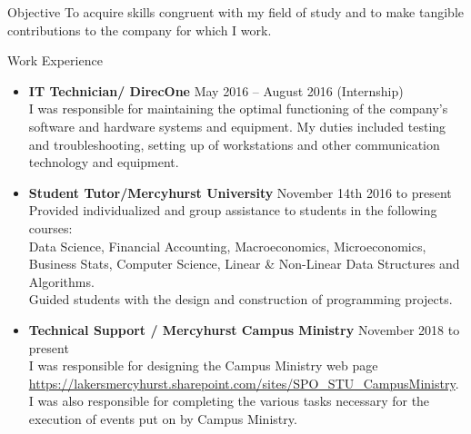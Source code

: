 \documentclass[11pt]{resume} %
\newcommand{\bold}[1]{\textbf{#1}}
\begin{document}
	
\begin{rSection}{Objective}
	To acquire skills congruent with my field of study and to make tangible contributions to the company for which I work.
\end{rSection}
\begin{rSection}{Work Experience}
\begin{itemize}
	\item\bold{IT Technician/ DirecOne} \quad May 2016 – August 2016 (Internship)\\
	I was responsible for maintaining the optimal functioning of the company’s software and hardware systems and equipment. My duties included testing and troubleshooting, setting up of workstations and other communication technology and equipment.\\
	
	\item\bold{Student Tutor/Mercyhurst University} \quad November 14th 2016 to present\\
	Provided individualized and group assistance to students in the following courses:\\ Data Science, Financial Accounting, Macroeconomics, Microeconomics, Business Stats, Computer Science, Linear \& Non-Linear Data Structures and Algorithms.\\
	Guided students with the design and construction of programming projects.
	\\
	\item\bold{Technical Support / Mercyhurst Campus Ministry} \quad November 2018 to present\\
	 I was responsible for designing the Campus Ministry web page  \url{https://lakersmercyhurst.sharepoint.com/sites/SPO_STU_CampusMinistry}.\\
	I was also responsible for completing the various tasks necessary for the execution of events put on by Campus Ministry.\\
		
	
\end{itemize}
\end{rSection}
\end{document}
